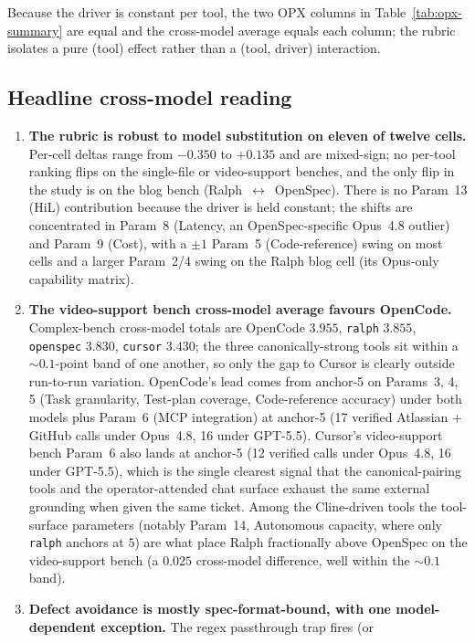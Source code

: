 Because the driver is constant per tool, the two OPX columns in
Table~\ref{tab:opx-summary} are equal and the cross-model average
equals each column; the rubric isolates a pure (tool) effect rather
than a (tool, driver) interaction.

\subsection{Headline cross-model reading}

\begin{enumerate}
\item \textbf{The rubric is robust to model substitution on eleven of
twelve cells.} Per-cell deltas range from $-0.350$ to $+0.135$ and are
mixed-sign; no per-tool ranking flips on the single-file or video-support benches,
and the only flip in the study is on the blog bench
(Ralph~$\leftrightarrow$~OpenSpec). There is no Param~13 (HiL)
contribution because the driver is held constant; the shifts are
concentrated in Param~8 (Latency, an OpenSpec-specific Opus~4.8
outlier) and Param~9 (Cost), with a $\pm1$ Param~5 (Code-reference)
swing on most cells and a larger Param~2/4 swing on the Ralph
blog cell (its Opus-only capability matrix).
\item \textbf{The video-support bench cross-model average favours
OpenCode.} Complex-bench cross-model totals are OpenCode $3.955$,
\texttt{ralph} $3.855$, \texttt{openspec} $3.830$, \texttt{cursor}
$3.430$; the three canonically-strong tools sit within a
${\sim}0.1$-point band of one another, so only the gap to Cursor is
clearly outside run-to-run variation. OpenCode's lead comes from anchor-5 on Params~3, 4, 5 (Task
granularity, Test-plan coverage, Code-reference accuracy) under both
models plus Param~6 (MCP integration) at anchor-5 (17 verified
Atlassian + GitHub calls under Opus~4.8, 16 under GPT-5.5). Cursor's
video-support bench Param~6 also lands at anchor-5 (12 verified calls under
Opus~4.8, 16 under GPT-5.5), which is the single clearest signal that
the canonical-pairing tools and the operator-attended chat surface
exhaust the same external grounding when given the same ticket. Among
the Cline-driven tools the tool-surface parameters (notably Param~14,
Autonomous capacity, where only \texttt{ralph} anchors at $5$) are
what place Ralph fractionally above OpenSpec on the video-support bench
(a $0.025$ cross-model difference, well within the ${\sim}0.1$ band).
\item \textbf{Defect avoidance is mostly spec-format-bound, with one
model-dependent exception.} The regex passthrough trap fires (or

\end{enumerate}
